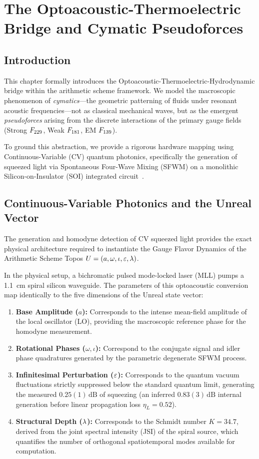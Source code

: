 \chapter[Optoacoustic Cymatics]{The Optoacoustic-Thermoelectric Bridge and Cymatic Pseudoforces}\label{ch:optoacoustic}

\section{Introduction}
This chapter formally introduces the Optoacoustic-Thermoelectric-Hydrodynamic bridge within the arithmetic scheme framework. We model the macroscopic phenomenon of \emph{cymatics}---the geometric patterning of fluids under resonant acoustic frequencies---not as classical mechanical waves, but as the emergent \emph{pseudoforces} arising from the discrete interactions of the primary gauge fields (Strong $F_{229}$, Weak $F_{181}$, EM $F_{139}$). 

To ground this abstraction, we provide a rigorous hardware mapping using Continuous-Variable (CV) quantum photonics, specifically the generation of squeezed light via Spontaneous Four-Wave Mixing (SFWM) on a monolithic Silicon-on-Insulator (SOI) integrated circuit~\cite{Green2024}.

\section{Continuous-Variable Photonics and the Unreal Vector}
The generation and homodyne detection of CV squeezed light provides the exact physical architecture required to instantiate the Gauge Flavor Dynamics of the Arithmetic Scheme Topos $U = (a, \omega, \iota, \varepsilon, \lambda)$.

In the physical setup, a bichromatic pulsed mode-locked laser (MLL) pumps a 1.1~cm spiral silicon waveguide. The parameters of this optoacoustic conversion map identically to the five dimensions of the Unreal state vector:

\begin{enumerate}
    \item \textbf{Base Amplitude ($a$):} Corresponds to the intense mean-field amplitude of the local oscillator (LO), providing the macroscopic reference phase for the homodyne measurement.
    \item \textbf{Rotational Phases ($\omega, \iota$):} Correspond to the conjugate signal and idler phase quadratures generated by the parametric degenerate SFWM process.
    \item \textbf{Infinitesimal Perturbation ($\varepsilon$):} Corresponds to the quantum vacuum fluctuations strictly suppressed below the standard quantum limit, generating the measured $0.25(1)\,\mathrm{dB}$ of squeezing (an inferred $0.83(3)\,\mathrm{dB}$ internal generation before linear propagation loss $\eta_L = 0.52$).
    \item \textbf{Structural Depth ($\lambda$):} Corresponds to the Schmidt number $K = 34.7$, derived from the joint spectral intensity (JSI) of the spiral source, which quantifies the number of orthogonal spatiotemporal modes available for computation.
\end{enumerate}

